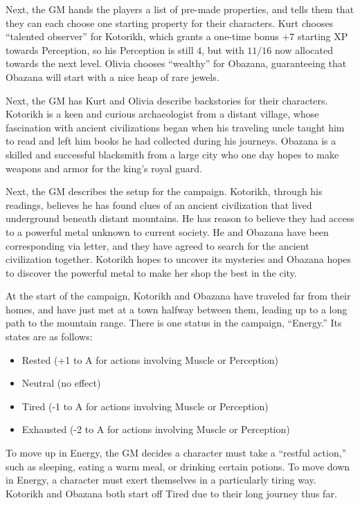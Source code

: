 \begin{example}
Next, the GM hands the players a list of pre-made properties, and tells them that they can each choose one starting property for their characters.
Kurt chooses ``talented observer'' for Kotorikh, which grants a one-time bonus $+7$ starting XP towards Perception, so his Perception is still $4$, but with $11/16$ now allocated towards the next level.
Olivia chooses ``wealthy'' for Obazana, guaranteeing that Obazana will start with a nice heap of rare jewels.

Next, the GM has Kurt and Olivia describe backstories for their characters.
Kotorikh is a keen and curious archaeologist from a distant village, whose fascination with ancient civilizations began when his traveling uncle taught him to read and left him books he had collected during his journeys.
Obazana is a skilled and successful blacksmith from a large city who one day hopes to make weapons and armor for the king’s royal guard.

Next, the GM describes the setup for the campaign.
Kotorikh, through his readings, believes he has found clues of an ancient civilization that lived underground beneath distant mountains.
He has reason to believe they had access to a powerful metal unknown to current society.
He and Obazana have been corresponding via letter, and they have agreed to search for the ancient civilization together.
Kotorikh hopes to uncover its mysteries and Obazana hopes to discover the powerful metal to make her shop the best in the city.

At the start of the campaign, Kotorikh and Obazana have traveled far from their homes, and have just met at a town halfway between them, leading up to a long path to the mountain range.
There is one status in the campaign, ``Energy.'' Its states are as follows:
\begin{itemize}
\item Rested (+1 to A for actions involving Muscle or Perception)
\item Neutral (no effect)
\item Tired (-1 to A for actions involving Muscle or Perception)
\item Exhausted (-2 to A for actions involving Muscle or Perception)
\end{itemize}
To move up in Energy, the GM decides a character must take a ``restful action,'' such as sleeping, eating a warm meal, or drinking certain potions.
To move down in Energy, a character must exert themselves in a particularly tiring way.
Kotorikh and Obazana both start off Tired due to their long journey thus far.


\end{example}
